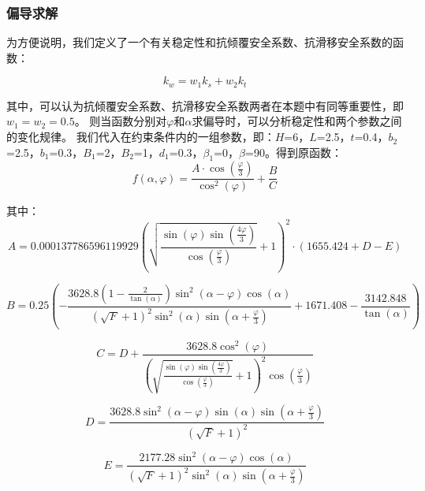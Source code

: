 \documentclass[withoutpreface,bwprint]{cumcmthesis}
\begin{document}
\subsubsection{偏导求解}
为方便说明，我们定义了一个有关稳定性和抗倾覆安全系数、抗滑移安全系数的函数：

    \begin{equation}
        k_w=w_1k_s+w_2k_t
    \end{equation}
\par
其中，可以认为抗倾覆安全系数、抗滑移安全系数两者在本题中有同等重要性，即$w_1=w_2=0.5$。
则当函数分别对$\varphi$和$\alpha$求偏导时，可以分析稳定性和两个参数之间的变化规律。
我们代入在约束条件内的一组参数，即：$H$=6，$L$=2.5，$t$=0.4，$b_2$=2.5，$b_1$=0.3，$B_1$=2，$B_2$=1，$d_1$=0.3，$\beta_1$=0，$\beta$=90。得到原函数：
    \begin{equation}
        f(\alpha, \varphi) = \frac{A \cdot \cos\left(\frac{\varphi}{3}\right)}{\cos^2(\varphi)} + \frac{B}{C}
    \end{equation}

其中：
    \begin{equation*}
        A = 0.000137786596119929 \left( \sqrt{\frac{\sin(\varphi) \sin\left(\frac{4\varphi}{3}\right)}{\cos\left(\frac{\varphi}{3}\right)}} + 1 \right)^2 \cdot \left( 1655.424 + D - E \right)
    \end{equation*}

    \begin{equation*}
        B = 0.25 \left( -\frac{3628.8 \left(1 - \frac{2}{\tan(\alpha)}\right) \sin^2(\alpha-\varphi) \cos(\alpha)}{(\sqrt{F} + 1)^2 \sin^2(\alpha) \sin\left(\alpha+\frac{\varphi}{3}\right)} + 1671.408 - \frac{3142.848}{\tan(\alpha)} \right)
    \end{equation*}

    \begin{equation*}
        C = D + \frac{3628.8 \cos^2(\varphi)}{\left( \sqrt{\frac{\sin(\varphi) \sin\left(\frac{4\varphi}{3}\right)}{\cos\left(\frac{\varphi}{3}\right)}} + 1 \right)^2 \cos\left(\frac{\varphi}{3}\right)}
    \end{equation*}

    \begin{equation*}
        D = \frac{3628.8 \sin^2(\alpha-\varphi) \sin(\alpha) \sin\left(\alpha+\frac{\varphi}{3}\right)}{(\sqrt{F} + 1)^2}
    \end{equation*}

    \begin{equation*}
        E = \frac{2177.28 \sin^2(\alpha-\varphi) \cos(\alpha)}{(\sqrt{F} + 1)^2 \sin^2(\alpha) \sin\left(\alpha+\frac{\varphi}{3}\right)}
    \end{equation*}
\end{document}
